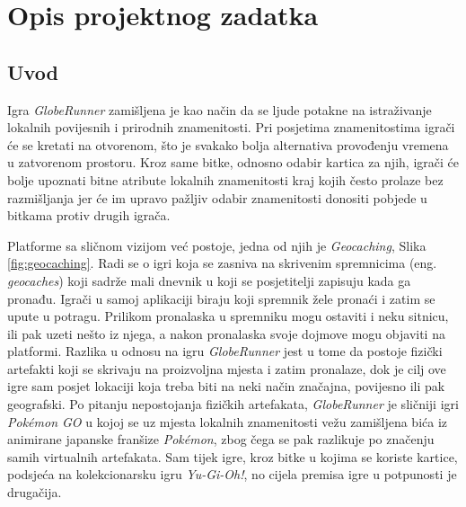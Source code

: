 \chapter{Opis projektnog zadatka}
    \section{Uvod}
		
		Igra \textit{GlobeRunner} zamišljena je kao način da se ljude potakne na istraživanje lokalnih povijesnih i prirodnih znamenitosti. Pri posjetima znamenitostima igrači će se kretati na otvorenom, što je svakako bolja alternativa provođenju vremena u zatvorenom prostoru. Kroz same bitke, odnosno odabir kartica za njih, igrači će bolje upoznati bitne atribute lokalnih znamenitosti kraj kojih često prolaze bez razmišljanja jer će im upravo pažljiv odabir znamenitosti donositi pobjede u bitkama protiv drugih igrača.\par
		
		Platforme sa sličnom vizijom već postoje, jedna od njih je \textit{Geocaching}, Slika \ref{fig:geocaching}. Radi se o igri koja se zasniva na skrivenim spremnicima (eng. \textit{geocaches}) koji sadrže mali dnevnik u koji se posjetitelji zapisuju kada ga pronađu. Igrači u samoj aplikaciji biraju koji spremnik žele pronaći i zatim se upute u potragu. Prilikom pronalaska u spremniku mogu ostaviti i neku sitnicu, ili pak uzeti nešto iz njega, a nakon pronalaska svoje dojmove mogu objaviti na platformi. Razlika u odnosu na igru \textit{GlobeRunner} jest u tome da postoje fizički artefakti koji se skrivaju na proizvoljna mjesta i zatim pronalaze, dok je cilj ove igre sam posjet lokaciji koja treba biti na neki način značajna, povijesno ili pak geografski. Po pitanju nepostojanja fizičkih artefakata, \textit{GlobeRunner} je sličniji igri \textit{Pokémon GO} u kojoj se uz mjesta lokalnih znamenitosti vežu zamišljena bića iz animirane japanske franšize \textit{Pokémon}, zbog čega se pak razlikuje po značenju samih virtualnih artefakata. Sam tijek igre, kroz bitke u kojima se koriste kartice, podsjeća na kolekcionarsku igru \textit{Yu-Gi-Oh!}, no cijela premisa igre u potpunosti je drugačija.
		
